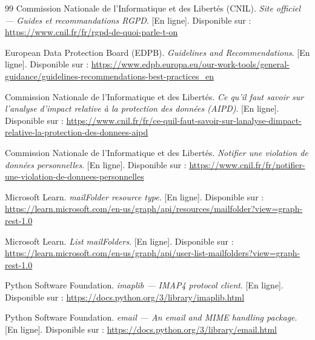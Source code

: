 \documentclass[12pt,a4paper]{report}
\begin{document}
\begin{thebibliography}{99}
Commission Nationale de l'Informatique et des Libertés (CNIL). \textit{Site officiel --- Guides et recommandations RGPD}. [En ligne]. Disponible sur : \url{https://www.cnil.fr/fr/rgpd-de-quoi-parle-t-on}

European Data Protection Board (EDPB). \textit{Guidelines and Recommendations}. [En ligne]. Disponible sur : \url{https://www.edpb.europa.eu/our-work-tools/general-guidance/guidelines-recommendations-best-practices_en}

Commission Nationale de l'Informatique et des Libertés. \textit{Ce qu'il faut savoir sur l'analyse d'impact relative à la protection des données (AIPD)}. [En ligne]. Disponible sur : \url{https://www.cnil.fr/fr/ce-quil-faut-savoir-sur-lanalyse-dimpact-relative-la-protection-des-donnees-aipd}

Commission Nationale de l'Informatique et des Libertés. \textit{Notifier une violation de données personnelles}. [En ligne]. Disponible sur : \url{https://www.cnil.fr/fr/notifier-une-violation-de-donnees-personnelles}

Microsoft Learn. \textit{mailFolder resource type}. [En ligne]. Disponible sur : \url{https://learn.microsoft.com/en-us/graph/api/resources/mailfolder?view=graph-rest-1.0}

Microsoft Learn. \textit{List mailFolders}. [En ligne]. Disponible sur : \url{https://learn.microsoft.com/en-us/graph/api/user-list-mailfolders?view=graph-rest-1.0}

Python Software Foundation. \textit{imaplib --- IMAP4 protocol client}. [En ligne]. Disponible sur : \url{https://docs.python.org/3/library/imaplib.html}

Python Software Foundation. \textit{email --- An email and MIME handling package}. [En ligne]. Disponible sur : \url{https://docs.python.org/3/library/email.html}

\end{thebibliography}
\end{document}
